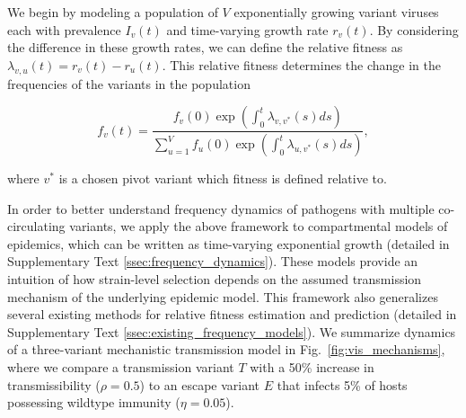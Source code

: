 \documentclass[11pt,oneside,letterpaper]{article}
\newcommand{\varEscape}{\eta}
\newcommand{\varTransmission}{\rho}
\begin{document}
We begin by modeling a population of $V$ exponentially growing variant viruses each with prevalence $I_v(t)$ and time-varying growth rate $r_v(t)$.
By considering the difference in these growth rates, we can define the relative fitness as $\lambda_{v, u}(t) = r_v(t) - r_u(t)$.
This relative fitness determines the change in the frequencies of the variants in the population

\begin{equation}
    f_v(t) = \frac{f_v(0) \exp \left( \int_0^t \lambda_{v, v^*}(s)ds \right)}{ \sum_{u=1}^{V} f_u(0) \exp \left( \int_0^t \lambda_{u, v^*}(s)ds \right)},
\end{equation}

where $v^*$ is a chosen pivot variant which fitness is defined relative to.

In order to better understand frequency dynamics of pathogens with multiple co-circulating variants, we apply the above framework to compartmental models of epidemics, which can be written as time-varying exponential growth (detailed in Supplementary Text \ref{ssec:frequency_dynamics}).
These models provide an intuition of how strain-level selection depends on the assumed transmission mechanism of the underlying epidemic model.
This framework also generalizes several existing methods for relative fitness estimation and prediction (detailed in Supplementary Text \ref{ssec:existing_frequency_models}).
We summarize dynamics of a three-variant mechanistic transmission model in Fig.~\ref{fig:vis_mechanisms}, where we compare a transmission variant $T$ with a 50\% increase in transmissibility ($\varTransmission=0.5$) to an escape variant $E$ that infects 5\% of hosts possessing wildtype immunity ($\varEscape=0.05$).
\end{document}
